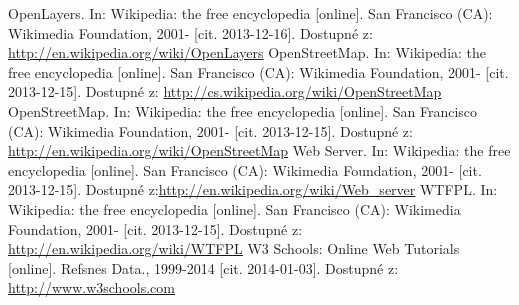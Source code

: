 \documentclass[11pt,a4paper,titlepage,oneside]{book}
\begin{document}
\begin{thebibliography}{99}
	OpenLayers. In: Wikipedia: the free encyclopedia [online]. San Francisco (CA): Wikimedia Foundation, 2001- [cit. 2013-12-16]. Dostupné z: \url{http://en.wikipedia.org/wiki/OpenLayers}
	OpenStreetMap. In: Wikipedia: the free encyclopedia [online]. San Francisco (CA): Wikimedia Foundation, 2001- [cit. 2013-12-15]. Dostupné z: \url{http://cs.wikipedia.org/wiki/OpenStreetMap}
	OpenStreetMap. In: Wikipedia: the free encyclopedia [online]. San Francisco (CA): Wikimedia Foundation, 2001- [cit. 2013-12-15]. Dostupné z: \url{http://en.wikipedia.org/wiki/OpenStreetMap}
	Web Server. In: Wikipedia: the free encyclopedia [online]. San Francisco (CA): Wikimedia Foundation, 2001- [cit. 2013-12-15]. Dostupné z:\url{http://en.wikipedia.org/wiki/Web_server}
	 WTFPL. In: Wikipedia: the free encyclopedia [online]. San Francisco (CA): Wikimedia Foundation, 2001- [cit. 2013-12-15]. Dostupné z: \url{http://en.wikipedia.org/wiki/WTFPL}
	W3 Schools: Online Web Tutorials [online]. Refsnes Data., 1999-2014 [cit. 2014-01-03]. Dostupné z: \url{http://www.w3schools.com}
\end{thebibliography}
\end{document}
